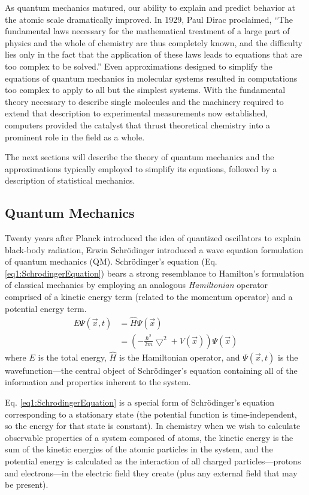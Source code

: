 As quantum mechanics matured, our ability to explain and predict behavior at the
atomic scale dramatically improved. In 1929, Paul Dirac proclaimed, ``The
fundamental laws necessary for the mathematical treatment of a large part of
physics and the whole of chemistry are thus completely known, and the difficulty
lies only in the fact that the application of these laws leads to equations that
are too complex to be solved.'' Even approximations designed to simplify the
equations of quantum mechanics in molecular systems resulted in computations too
complex to apply to all but the simplest systems. With the fundamental theory
necessary to describe single molecules and the machinery required to extend
that description to experimental measurements now established, computers
provided the catalyst that thrust theoretical chemistry into a prominent role in
the field as a whole.

The next sections will describe the theory of quantum mechanics and the
approximations typically employed to simplify its equations, followed by
a description of statistical mechanics.

\subsection{Quantum Mechanics}

Twenty years after Planck introduced the idea of quantized oscillators to
explain black-body radiation, Erwin Schr\"odinger introduced a wave equation
formulation of quantum mechanics (QM). \cite{Schrodinger1926} Schr\"odinger's
equation (Eq. \ref{eq1:SchrodingerEquation}) bears a strong resemblance to
Hamilton's formulation of classical mechanics by employing an analogous
\textit{Hamiltonian} operator comprised of a kinetic energy term (related to the
momentum operator) and a potential energy term.
\begin{align}
   E \Psi(\vec{x}, t) & = \hat{H} \Psi(\vec{x}) \nonumber \\
   & = \left ( -\frac {\hbar ^ 2} {2 m} \bigtriangledown ^ 2 + V(\vec{x})
   \right) \Psi(\vec{x})
   \label{eq1:SchrodingerEquation}
\end{align}
where $E$ is the total energy, $\hat{H}$ is the Hamiltonian operator, and
$\Psi(\vec{x}, t)$ is the wavefunction---the central object of Schr\"odinger's
equation containing all of the information and properties inherent to the
system.

Eq. \ref{eq1:SchrodingerEquation} is a special form of Schr\"odinger's
equation corresponding to a stationary state (\ie the potential function is
time-independent, so the energy for that state is constant). In chemistry when
we wish to calculate observable properties of a system composed of atoms, the
kinetic energy is the sum of the kinetic energies of the atomic particles in the
system, and the potential energy is calculated as the interaction of all charged
particles---protons and electrons---in the electric field they create (plus any
external field that may be present).

